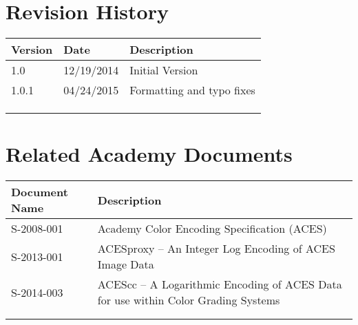 \prelimsectionformat	%
\chapter{Revision History}

\begin{tabularx}{\linewidth}{|l|l|X|}
    \hline
    Version & Date & Description \\ \hline
    1.0     & 12/19/2014     & Initial Version      \\ \hline
    1.0.1   & 04/24/2015     & Formatting and typo fixes \\ \hline
            &      &             \\ \hline
            &      &             \\ \hline
            &      &             \\ \hline
\end{tabularx}

\vspace{0.25in} %
\chapter{Related Academy Documents} %
\begin{tabularx}{\linewidth}{|l|X|}
    \hline
    Document Name & Description  \\ \hline
    S-2008-001 & Academy Color Encoding Specification (ACES) \\ \hline
    S-2013-001 & ACESproxy -- An Integer Log Encoding of ACES Image Data \\ \hline    
    S-2014-003 & ACEScc -- A Logarithmic Encoding of ACES Data for use within Color Grading Systems \\ \hline
    & \\ \hline
    & \\ \hline
\end{tabularx}